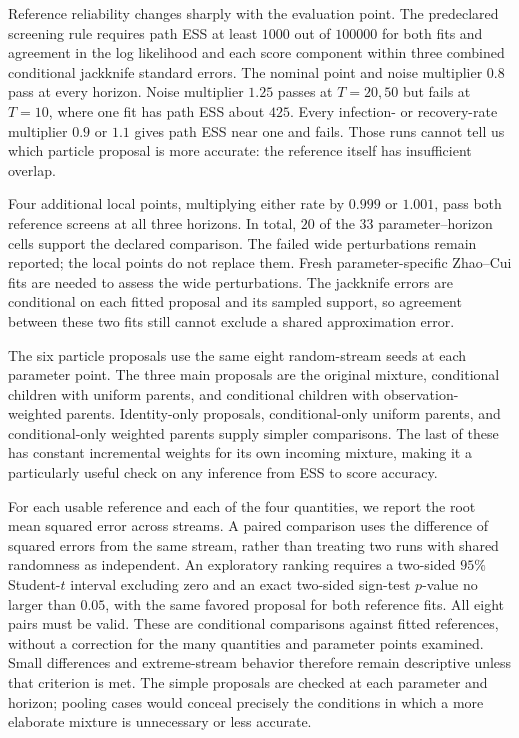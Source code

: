 Reference reliability changes sharply with the evaluation point. The
predeclared screening rule requires path ESS at least $1000$ out of $100000$
for both fits and agreement in the log likelihood and each score component
within three combined conditional jackknife standard errors. The nominal point
and noise multiplier $0.8$ pass at every horizon. Noise multiplier $1.25$ passes
at $T=20,50$ but fails at $T=10$, where one fit has path ESS about $425$.
Every infection- or recovery-rate multiplier $0.9$ or $1.1$ gives path ESS near
one and fails. Those runs cannot tell us which particle proposal is more
accurate: the reference itself has insufficient overlap.

Four additional local points, multiplying either rate by $0.999$ or $1.001$,
pass both reference screens at all three horizons. In total, $20$ of the $33$
parameter--horizon cells support the declared comparison. The failed wide
perturbations remain reported; the local points do not replace them. Fresh
parameter-specific Zhao--Cui fits are needed to assess the wide perturbations.
The jackknife errors are conditional on each fitted proposal and its sampled
support, so agreement between these two fits still cannot exclude a shared
approximation error.

The six particle proposals use the same eight random-stream seeds at each
parameter point. The three main proposals are the original mixture, conditional
children with uniform parents, and conditional children with observation-weighted
parents. Identity-only proposals, conditional-only uniform parents, and
conditional-only weighted parents supply simpler comparisons. The last of these
has constant incremental weights for its own incoming mixture, making it a
particularly useful check on any inference from ESS to score accuracy.

For each usable reference and each of the four quantities, we report the
root mean squared error across streams. A paired comparison uses the difference
of squared errors from the same stream, rather than treating two runs with
shared randomness as independent. An exploratory ranking requires a two-sided
$95\%$ Student-$t$ interval excluding zero and an exact two-sided sign-test
$p$-value no larger than $0.05$, with the same favored proposal for both reference
fits. All eight pairs must be valid. These are conditional comparisons against
fitted references, without a correction for the many quantities and parameter
points examined. Small differences and extreme-stream behavior therefore remain
descriptive unless that criterion is met. The simple proposals are checked at
each parameter and horizon; pooling cases would conceal precisely the
conditions in which a more elaborate mixture is unnecessary or less accurate.


